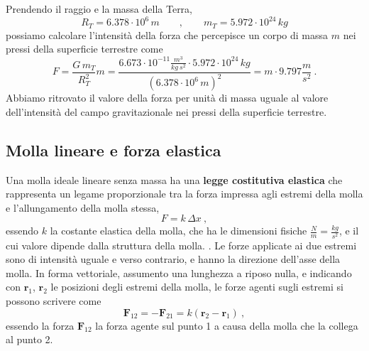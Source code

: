 \begin{example} Prendendo il raggio e la massa della Terra, 
    \begin{equation}
        R_T = 6.378 \cdot 10^6 \, m \qquad , \qquad  m_T = 5.972 \cdot 10^{24} \, kg
    \end{equation}
    possiamo calcolare l'intensità della forza che percepisce un corpo di massa $m$ nei pressi della superficie terrestre come
    \begin{equation}
        F = \dfrac{G \, m_T}{R_T^2} m = \dfrac{ 6.673 \cdot 10^{-11} \frac{m^3}{kg \ s^2} \cdot  5.972 \cdot 10^{24} \, kg }{\left(6.378 \cdot 10^6 \, m \right)^2} = m \cdot 9.797 \dfrac{m}{s^2} \ .
    \end{equation}
    Abbiamo ritrovato il valore della forza per unità di massa uguale al valore dell'intensità del campo gravitazionale nei pressi della superficie terrestre.
\end{example}

\begin{example}
\end{example}

\subsection{Molla lineare e forza elastica}
Una molla ideale lineare senza massa ha una \textbf{legge costitutiva elastica} che rappresenta un legame proporzionale tra la forza impressa agli estremi della molla e l'allungamento della molla stessa,
\begin{equation}
    F = k \, \Delta x \ ,
\end{equation}
essendo $k$ la costante elastica della molla, che ha le dimensioni fisiche $\frac{N}{m} = \frac{kg}{s^2}$, e il cui valore dipende dalla struttura della molla.
.
Le forze applicate ai due estremi sono di intensità uguale e verso contrario, e hanno la direzione dell'asse della molla. In forma vettoriale, assumento una lunghezza a riposo nulla, e indicando con $\mathbf{r}_1$, $\mathbf{r}_2$ le posizioni degli estremi della molla, le forze agenti sugli estremi si possono scrivere come
\begin{equation}
    \mathbf{F}_{12} = - \mathbf{F}_{21} =  k \left( \mathbf{r}_2 - \mathbf{r}_1 \right) \ ,
\end{equation}
essendo la forza $\mathbf{F}_{12}$ la forza agente sul punto 1 a causa della molla che la collega al punto 2.

